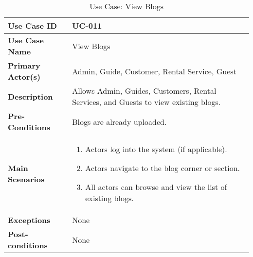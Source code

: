 \begin{table}[ht]
    \centering
    \begin{tabular}{|l|p{}|}
        \hline
        \textbf{Use Case ID} & UC-011 \\
        \hline
        \textbf{Use Case Name} & View Blogs \\
        \hline
        \textbf{Primary Actor(s)} & Admin, Guide, Customer, Rental Service, Guest \\
        \hline
        \textbf{Description} & Allows Admin, Guides, Customers, Rental Services, and Guests to view existing blogs. \\
        \hline
        \textbf{Pre-Conditions} & Blogs are already uploaded. \\
        \hline
        \textbf{Main Scenarios} & 
        \begin{enumerate}[label=\arabic*.,itemsep=0pt]
            \item Actors log into the system (if applicable).
            \item Actors navigate to the blog corner or section.
            \item All actors can browse and view the list of existing blogs.
        \end{enumerate} \\
        \hline
        \textbf{Exceptions} & None \\
        \hline
        \textbf{Post-conditions} & None \\
        \hline
    \end{tabular}
    \label{tab:use-case-view-blogs}
    \caption{Use Case: View Blogs}
\end{table}


